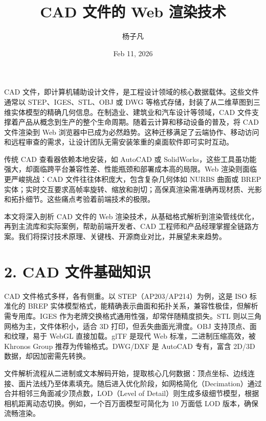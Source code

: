 \title{CAD 文件的 Web 渲染技术}
\author{杨子凡}
\date{Feb 11, 2026}
\maketitle
CAD 文件，即计算机辅助设计文件，是工程设计领域的核心数据载体。这些文件通常以 STEP、IGES、STL、OBJ 或 DWG 等格式存储，封装了从二维草图到三维实体模型的精确几何信息。在制造业、建筑业和汽车设计等领域，CAD 文件支撑着产品从概念到生产的整个生命周期。随着云计算和移动设备的普及，将 CAD 文件渲染到 Web 浏览器中已成为必然趋势。这种迁移满足了云端协作、移动访问和远程审查的需求，让设计团队无需安装笨重的桌面软件即可实时互动。\par
传统 CAD 查看器依赖本地安装，如 AutoCAD 或 SolidWorks，这些工具虽功能强大，却面临跨平台兼容性差、性能瓶颈和部署成本高的局限。Web 渲染则面临更严峻挑战：CAD 文件往往体积庞大，包含复杂几何体如 NURBS 曲面或 BREP 实体；实时交互要求高帧率旋转、缩放和剖切；高保真渲染需准确再现材质、光影和拓扑细节。这些痛点考验着前端技术的极限。\par
本文将深入剖析 CAD 文件的 Web 渲染技术，从基础格式解析到渲染管线优化，再到主流库和实际案例，帮助前端开发者、CAD 工程师和产品经理掌握全链路方案。我们将探讨技术原理、关键栈、开源商业对比，并展望未来趋势。\par
\chapter{2. CAD 文件基础知识}
CAD 文件格式多样，各有侧重。以 STEP（AP203/AP214）为例，这是 ISO 标准化的 BREP 实体模型格式，能精确表示曲面和拓扑关系，兼容性极佳，但解析需专用库。IGES 作为老牌交换格式通用性强，却常伴随精度损失。STL 则以三角网格为主，文件体积小，适合 3D 打印，但丢失曲面光滑度。OBJ 支持顶点、面和纹理，易于 WebGL 直接加载。glTF 是现代 Web 标准，二进制压缩高效，被 Khronos Group 推荐为传输格式。DWG/DXF 是 AutoCAD 专有，富含 2D/3D 数据，却因加密需先转换。\par
文件解析流程从二进制或文本解码开始，提取核心几何数据：顶点坐标、边线连接、面片法线乃至体素填充。随后进入优化阶段，如网格简化（Decimation）通过合并相邻三角面减少顶点数，LOD（Level of Detail）则生成多级细节模型，根据相机距离动态切换。例如，一个百万面模型可简化为 10 万面低 LOD 版本，确保流畅渲染。\par
